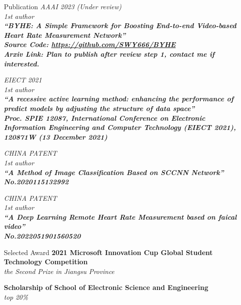 \documentclass{resume} %
\begin{document}
\begin{rSection}{Publication}
    {\em AAAI 2023 (Under review) \\ 1st author\\ \bf ``BYHE: A Simple Framework for Boosting End-to-end Video-based Heart Rate Measurement Network'' \\ Source Code: \url{https://github.com/SWY666/BYHE} \\ \em Arxiv Link: Plan to publish after review step 1, contact me if interested.}

    {\em EIECT 2021 \\ 1st author \\ \bf ``A recessive active learning method: enhancing the performance of predict models by adjusting the structure of data space'' \\ \em Proc. SPIE 12087, International Conference on Electronic Information Engineering and Computer Technology (EIECT 2021), 120871W (13 December 2021)}

    {\em CHINA PATENT \\ 1st author \\ \bf ``A Method of Image Classification Based on SCCNN Network'' \\ \em No.2020115132992}

    {\em CHINA PATENT \\ 1st author \\ \bf ``A Deep Learning Remote Heart Rate Measurement based on faical video'' \\ \em No.2022051901560520}

\end{rSection}

\begin{rSection}{Selected Award}
    {{\bf 2021 Microsoft Innovation Cup Global Student Technology Competition} \\ \hfill {\em the Second Prize in Jiangsu Province}}

    {{\bf Scholarship of School of Electronic Science and Engineering} \\ \hfill {\em top 20\%}}
\end{rSection}


\end{document}
